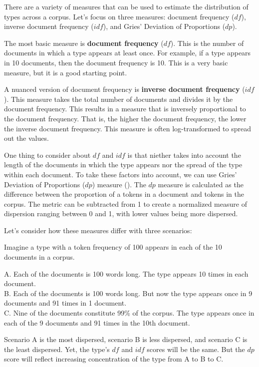\documentclass[
  letterpaper,
]{latex/krantz}
\theoremstyle{definition}
\theoremstyle{remark}
\begin{document}
There are a variety of measures that can be used to estimate the
distribution of types across a corpus. Let's focus on three measures:
document frequency (\(df\)), inverse document frequency (\(idf\)), and
Gries' Deviation of Proportions (\(dp\)).

The most basic measure is \textbf{document frequency} (\(df\)). This is
the number of documents in which a type appears at least once. For
example, if a type appears in 10 documents, then the document frequency
is 10. This is a very basic measure, but it is a good starting point.

A nuanced version of document frequency is \textbf{inverse document
frequency} (\(idf\)). This measure takes the total number of documents
and divides it by the document frequency. This results in a measure that
is inversely proportional to the document frequency. That is, the higher
the document frequency, the lower the inverse document frequency. This
measure is often log-transformed to spread out the values.

One thing to consider about \(df\) and \(idf\) is that niether takes
into account the length of the documents in which the type appears nor
the spread of the type within each document. To take these factors into
account, we can use Gries' Deviation of Proportions (\(dp\)) measure
(). The \(dp\) measure
is calculated as the difference between the proportion of a tokens in a
document and tokens in the corpus. The metric can be subtracted from 1
to create a normalized measure of dispersion ranging between 0 and 1,
with lower values being more dispersed.

Let's consider how these measures differ with three scenarios:

Imagine a type with a token frequency of 100 appears in each of the 10
documents in a corpus.

A. Each of the documents is 100 words long. The type appears 10 times in
each document.\\
B. Each of the documents is 100 words long. But now the type appears
once in 9 documents and 91 times in 1 document.\\
C. Nine of the documents constitute 99\% of the corpus. The type appears
once in each of the 9 documents and 91 times in the 10th document.

Scenario A is the most dispersed, scenario B is less dispersed, and
scenario C is the least dispersed. Yet, the type's \(df\) and \(idf\)
scores will be the same. But the \(dp\) score will reflect increasing
concentration of the type from A to B to C.
\end{document}
